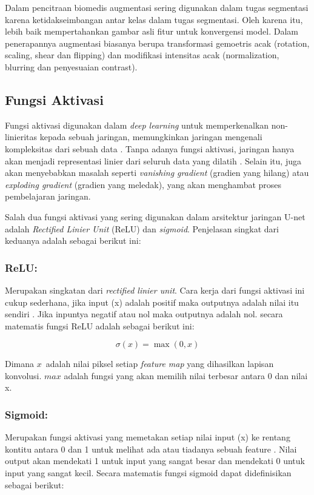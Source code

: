 \noindent Dalam pencitraan biomedis augmentasi sering digunakan dalam tugas segmentasi karena ketidakseimbangan antar kelas dalam tugas segmentasi. Oleh karena itu, lebih baik mempertahankan gambar asli fitur untuk konvergensi model. Dalam penerapannya augmentasi biasanya berupa transformasi gemoetris acak (rotation, scaling, shear dan flipping) dan modifikasi intensitas acak (normalization, blurring dan penyesuaian contrast)\cite{minaee_image_2020}.


\subsection{Fungsi Aktivasi}

\noindent Fungsi aktivasi digunakan dalam \textit{deep learning} untuk memperkenalkan non-linieritas kepada sebuah jaringan, memungkinkan jaringan mengenali kompleksitas dari sebuah data \cite{younisse_fine-tuning_2023}. Tanpa adanya fungsi aktivasi, jaringan hanya akan menjadi representasi linier dari seluruh data yang dilatih \cite{chiang_activation_2023}. Selain itu, juga akan menyebabkan masalah seperti \textit{vanishing gradient} (gradien yang hilang) atau \textit{exploding gradient} (gradien yang meledak), yang akan menghambat proses pembelajaran jaringan. 

\noindent Salah dua fungsi aktivasi yang sering digunakan dalam arsitektur jaringan U-net adalah \textit{Rectified Linier Unit} (ReLU) dan \textit{sigmoid}. Penjelasan singkat dari keduanya adalah sebagai berikut ini:

\subsubsection{ReLU:}
Merupakan singkatan dari \textit{rectified linier unit}. Cara kerja dari fungsi aktivasi ini cukup sederhana, jika input (x) adalah positif maka outputnya adalah nilai itu sendiri \cite{younisse_fine-tuning_2023}. Jika inpuntya negatif atau nol maka outputnya adalah nol. secara matematis fungsi ReLU adalah sebagai berikut ini: 

\begin{equation}
	\sigma(x) = \max(0, x)
\end{equation}

Dimana \(x\)\ adalah nilai piksel setiap \textit{feature map} yang dihasilkan lapisan konvolusi. \(max\) adalah fungsi yang akan memilih nilai terbesar antara 0 dan nilai x.

\subsubsection{Sigmoid:}
Merupakan fungsi aktivasi yang memetakan setiap nilai input (x) ke rentang kontitu antara 0 dan 1 untuk melihat ada atau tiadanya sebuah feature \cite{younisse_fine-tuning_2023}. Nilai output akan mendekati 1 untuk input yang sangat besar dan mendekati 0 untuk input yang sangat kecil. Secara matematis fungsi sigmoid dapat didefinisikan sebagai berikut:

